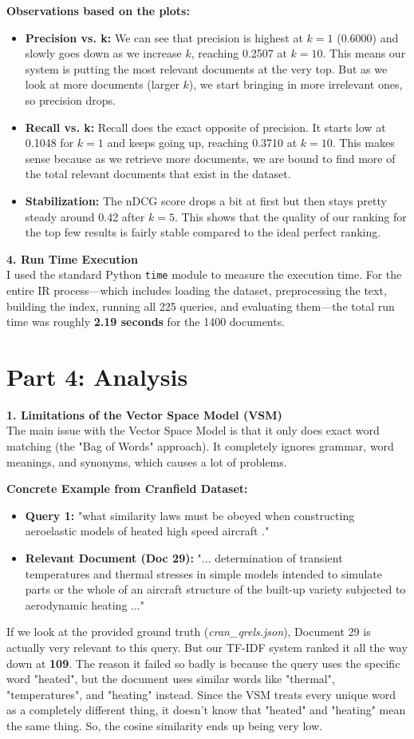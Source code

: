 \documentclass{svproc}
\begin{document}
\textbf{Observations based on the plots:}
\begin{itemize}
    \item \textbf{Precision vs. k:} We can see that precision is highest at $k=1$ (0.6000) and slowly goes down as we increase $k$, reaching 0.2507 at $k=10$. This means our system is putting the most relevant documents at the very top. But as we look at more documents (larger $k$), we start bringing in more irrelevant ones, so precision drops.
    \item \textbf{Recall vs. k:} Recall does the exact opposite of precision. It starts low at 0.1048 for $k=1$ and keeps going up, reaching 0.3710 at $k=10$. This makes sense because as we retrieve more documents, we are bound to find more of the total relevant documents that exist in the dataset.
    \item \textbf{Stabilization:} The nDCG score drops a bit at first but then stays pretty steady around 0.42 after $k=5$. This shows that the quality of our ranking for the top few results is fairly stable compared to the ideal perfect ranking.
\end{itemize}

\textbf{4. Run Time Execution} \\
I used the standard Python \texttt{time} module to measure the execution time. For the entire IR process—which includes loading the dataset, preprocessing the text, building the index, running all 225 queries, and evaluating them—the total run time was roughly \textbf{2.19 seconds} for the 1400 documents.


\section*{Part 4: Analysis}
\textbf{1. Limitations of the Vector Space Model (VSM)} \\
The main issue with the Vector Space Model is that it only does exact word matching (the "Bag of Words" approach). It completely ignores grammar, word meanings, and synonyms, which causes a lot of problems.

\textbf{Concrete Example from Cranfield Dataset:}
\begin{itemize}
    \item \textbf{Query 1:} "what similarity laws must be obeyed when constructing aeroelastic models of heated high speed aircraft ."
    \item \textbf{Relevant Document (Doc 29):} "... determination of transient temperatures and thermal stresses in simple models intended to simulate parts or the whole of an aircraft structure of the built-up variety subjected to aerodynamic heating ..."
\end{itemize}
If we look at the provided ground truth (\textit{cran\_qrels.json}), Document 29 is actually very relevant to this query. But our TF-IDF system ranked it all the way down at \textbf{109}. The reason it failed so badly is because the query uses the specific word "heated", but the document uses similar words like "thermal", "temperatures", and "heating" instead. Since the VSM treats every unique word as a completely different thing, it doesn't know that "heated" and "heating" mean the same thing. So, the cosine similarity ends up being very low.
\end{document}
